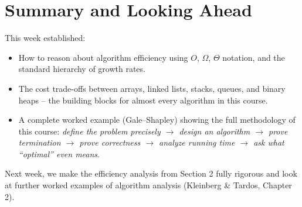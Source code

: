 \documentclass[11pt]{article}
\begin{document}
\section{Summary and Looking Ahead}

This week established:
\begin{itemize}
    \item How to reason about algorithm efficiency using $O$, $\Omega$, $\Theta$ notation,
    and the standard hierarchy of growth rates.
    \item The cost trade-offs between arrays, linked lists, stacks, queues, and binary
    heaps -- the building blocks for almost every algorithm in this course.
    \item A complete worked example (Gale--Shapley) showing the full methodology of this
    course: \emph{define the problem precisely $\to$ design an algorithm $\to$ prove
    termination $\to$ prove correctness $\to$ analyze running time $\to$ ask what
    ``optimal'' even means}.
\end{itemize}

Next week, we make the efficiency analysis from Section 2 fully rigorous and look at
further worked examples of algorithm analysis (Kleinberg \& Tardos, Chapter 2).
\end{document}
